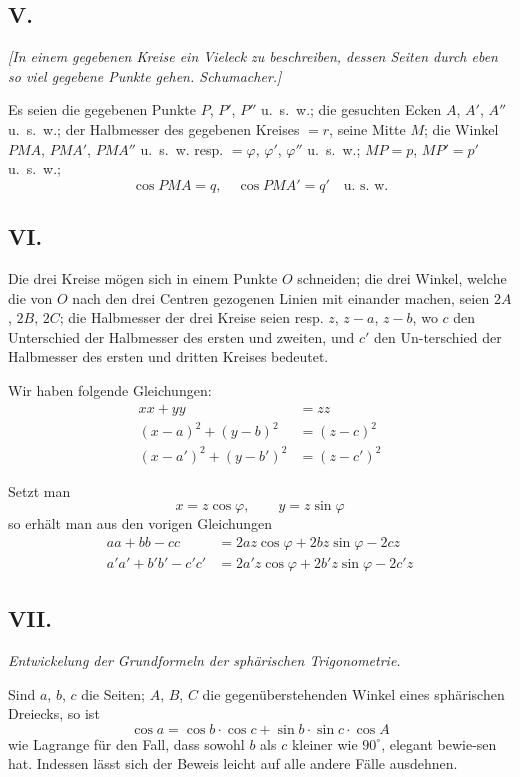 \documentclass[12pt,a4paper]{article}
\begin{document}
\subsection*{V.}

\textit{[In einem gegebenen Kreise ein Vieleck zu beschreiben, dessen Seiten durch
eben so viel gegebene Punkte gehen. Schumacher.]}

Es seien die gegebenen Punkte $P$, $P'$, $P''$ u.~s.~w.; die gesuchten Ecken
$A$, $A'$, $A''$ u.~s.~w.; der Halbmesser des gegebenen Kreises $= r$, seine Mitte $M$;
die Winkel $PMA$, $PMA'$, $PMA''$ u.~s.~w. resp. $=\varphi$, $\varphi'$, $\varphi''$ u.~s.~w.;
$MP=p$, $MP'=p'$ u.~s.~w.;
\[
\cos PMA = q,\quad \cos PMA' = q'\quad \text{u.~s.~w.}
\]

\newpage
\subsection*{VI.}

Die drei Kreise m\"ogen sich in einem Punkte $O$ schneiden; die drei Winkel,
welche die von $O$ nach den drei Centren gezogenen Linien mit einander machen,
seien $2A$, $2B$, $2C$; die Halbmesser der drei Kreise seien resp. $z$, $z-a$, $z-b$,
wo $c$ den Unterschied der Halbmesser des ersten und zweiten, und $c'$ den Un-\/terschied der Halbmesser des ersten und dritten Kreises bedeutet.

Wir haben folgende Gleichungen:
\begin{align*}
xx + yy &= zz \\
(x-a)^2 + (y-b)^2 &= (z-c)^2 \\
(x-a')^2 + (y-b')^2 &= (z-c')^2
\end{align*}

Setzt man
\[
x = z\cos\varphi,\qquad y = z\sin\varphi
\]
so erh\"alt man aus den vorigen Gleichungen
\begin{align*}
aa + bb - cc &= 2az\cos\varphi + 2bz\sin\varphi - 2cz \\
a'a' + b'b' - c'c' &= 2a'z\cos\varphi + 2b'z\sin\varphi - 2c'z
\end{align*}

\newpage
\subsection*{VII.}
\textit{Entwickelung der Grundformeln der sph\"arischen Trigonometrie.}

Sind $a$, $b$, $c$ die Seiten; $A$, $B$, $C$ die gegen\"uberstehenden Winkel eines
sph\"arischen Dreiecks, so ist
\[
\cos a = \cos b \cdot \cos c + \sin b \cdot \sin c \cdot \cos A
\]
wie Lagrange f\"ur den Fall, dass sowohl $b$ als $c$ kleiner wie $90^\circ$, elegant bewie-\/sen hat. Indessen l\"asst sich der Beweis leicht auf alle andere F\"alle ausdehnen.
\end{document}
